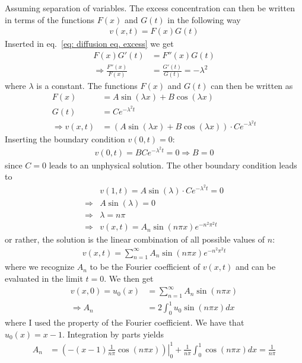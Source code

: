 \documentclass[twoside, 11pt]{article}
\begin{document}
		Assuming separation of variables. The excess concentration can then be written in terms of the functions $F(x)$ and $G(t)$ in the following way
		\begin{align*}
			v(x, t) = F(x)G(t)
		\end{align*}
		Inserted in eq.~\eqref{eq: diffusion eq. excess} we get
		\begin{align*}
			F(x)G'(t) &= F''(x)G(t) \\
			\Rightarrow \frac{F''(x)}{F(x)} &= \frac{G'(t)}{G(t)} = -\lambda^2			
		\end{align*}
		where $\lambda$ is a constant. The functions $F(x)$ and $G(t)$ can then be written as
		\begin{align*}
			F(x) &= A\sin(\lambda x) + B\cos(\lambda x) \\
			G(t) &= Ce^{-\lambda^2 t} \\
			\Rightarrow v(x, t) &= \left(A\sin(\lambda x) + B\cos(\lambda x)\right)\cdot Ce^{-\lambda^2 t}
		\end{align*}
		Inserting the boundary condition $v(0, t) = 0$:
		\begin{align*}
			v(0, t) = BCe^{-\lambda^2 t} = 0 \Rightarrow B = 0
		\end{align*}
		since $C=0$ leads to an unphysical solution. The other boundary condition leads to
		\begin{align*}
			&v(1, t) = A\sin(\lambda)\cdot Ce^{-\lambda^2 t} = 0 \\
			\Rightarrow& A\sin(\lambda) = 0 \\
			\Rightarrow& \lambda = n\pi \\
			\Rightarrow& v(x, t) = A_n\sin(n\pi x) e^{-n^2\pi^2t}
		\end{align*}
		or rather, the solution is the linear combination of all possible values of $n$:
		\begin{align}
			v(x, t) = \sum_{n=1}^\infty A_n\sin(n\pi x) e^{-n^2\pi^2 t}
		\end{align}
		where we recognize $A_n$ to be the Fourier coefficient of $v(x, t)$ and can be evaluated in the limit $t=0$.
		We then get
		\begin{align*}
			v(x, 0) = u_0(x) &= \sum_{n=1}^\infty A_n\sin(n\pi x) \\
			\Rightarrow A_n &= 2\int_0^1 u_0\sin(n\pi x) dx
		\end{align*}	
		where I used the property of the Fourier coefficient. We have that $u_0(x) = x-1$. Integration by parts yields
		\begin{align*}
			A_n &= \left.\left(-(x-1)\frac{1}{n\pi}\cos(n\pi x)\right)\right|^1_0 + \frac{1}{n\pi}\int_0^1\cos(n\pi x) dx = \frac{1}{n\pi}
		\end{align*}
		
\end{document}
